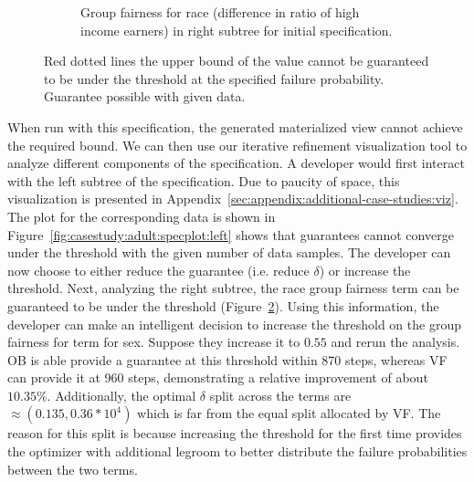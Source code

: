 \begin{figure}[ht]
\begin{subfigure}{0.48\linewidth}
    \caption{Group fairness for race (difference in ratio of high income earners) in right subtree for initial specification.}
    \label{fig:casestudy:adult:specplot:right}
    \end{subfigure}
    \caption{\figleft{}  Red dotted lines the upper bound of the value cannot be guaranteed to be under the threshold at the specified failure probability. \figright{} Guarantee possible with given data.}
\end{figure}


When run with this specification, the generated materialized view cannot achieve the required bound. 
We can then use our iterative refinement visualization tool to analyze different components of the specification. 
A developer would first interact with the left subtree of the specification. 
Due to paucity of space, this visualization is presented in Appendix~\ref{sec:appendix:additional-case-studies:viz}.
The plot for the corresponding data is shown in Figure~\ref{fig:casestudy:adult:specplot:left} shows that guarantees cannot converge under the threshold with the given number of data samples. 
The developer can now choose to either reduce the guarantee (i.e. reduce $\delta$) or increase the threshold. 
Next, analyzing the right subtree, the race group fairness term can be guaranteed to be under the threshold (Figure~\ref{fig:casestudy:adult:specplot:right}).
Using this information, the developer can make an intelligent decision to increase the threshold on the group fairness for term for sex. 
Suppose they increase it to $0.55$ and rerun the analysis.
OB is able provide a guarantee at this threshold within 870 steps, whereas VF can provide it at 960 steps, demonstrating a relative improvement of about $\mathbf{10.35\%}$.
Additionally, the optimal $\delta$ split across the terms are $\approx (0.135, 0.36 * 10^4)$ which is far from the equal split allocated by VF.
The reason for this split is because increasing the threshold for the first time provides the optimizer with additional legroom to better distribute the failure probabilities between the two terms.
